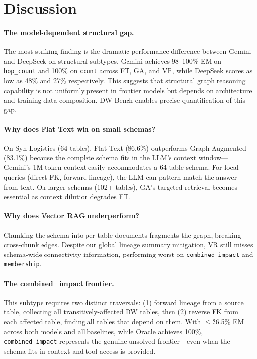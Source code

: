 \section{Discussion}

\paragraph{The model-dependent structural gap.}
The most striking finding is the dramatic performance difference between
Gemini and DeepSeek on structural subtypes. Gemini achieves 98--100\% EM
on \texttt{hop\_count} and 100\% on \texttt{count} across FT, GA, and VR,
while DeepSeek scores as low as 48\% and 27\% respectively. This
suggests that structural graph reasoning capability is not uniformly
present in frontier models but depends on architecture and training
data composition. DW-Bench enables precise quantification of this gap.

\paragraph{Why does Flat Text win on small schemas?}
On Syn-Logistics (64 tables), Flat Text (86.6\%) outperforms Graph-Augmented
(83.1\%) because the complete schema fits in the LLM's context
window---Gemini's 1M-token context easily accommodates a 64-table schema.
For local queries (direct FK, forward lineage), the LLM can
pattern-match the answer from text. On larger schemas (102+ tables),
GA's targeted retrieval becomes essential as context dilution degrades FT.

\paragraph{Why does Vector RAG underperform?}
Chunking the schema into per-table documents fragments the graph,
breaking cross-chunk edges. Despite our global lineage summary
mitigation, VR still misses schema-wide connectivity information,
performing worst on \texttt{combined\_impact} and \texttt{membership}.

\paragraph{The combined\_impact frontier.}
This subtype requires two distinct traversals: (1) forward lineage from
a source table, collecting all transitively-affected DW tables, then (2)
reverse FK from each affected table, finding all tables that depend on
them. With $\leq$26.5\% EM across both models and all baselines, while
Oracle achieves 100\%, \texttt{combined\_impact} represents the genuine
unsolved frontier---even when the schema fits in context and tool
access is provided.

